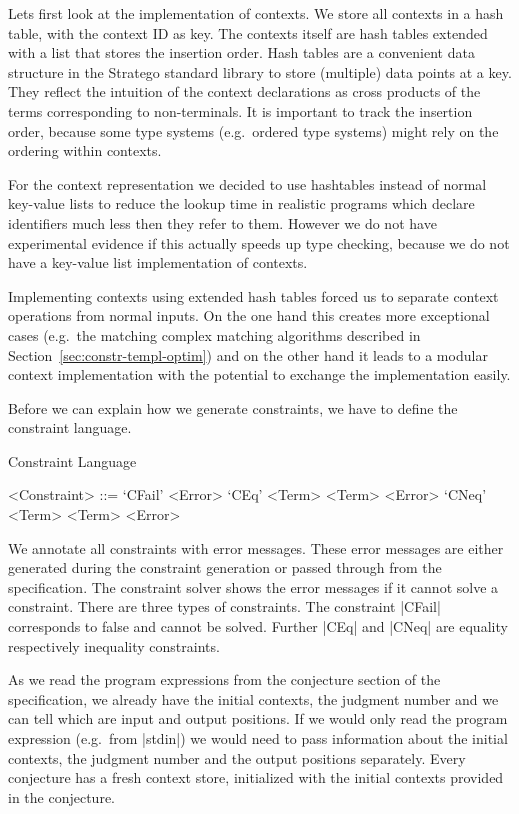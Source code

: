 Lets first look at the implementation of contexts. We store all
contexts in a hash table, with the context ID as key. The contexts
itself are hash tables extended with a list that stores the insertion
order. Hash tables are a convenient data structure in the Stratego
standard library to store (multiple) data points at a key. They
reflect the intuition of the context declarations as cross products of
the terms corresponding to non-terminals. It is important to track the
insertion order, because some type systems (e.g.\ ordered type
systems) might rely on the ordering within contexts.

For the context representation we decided to use hashtables instead of
normal key-value lists to reduce the lookup time in realistic programs
which declare identifiers much less then they refer to them. However
we do not have experimental evidence if this actually speeds up type
checking, because we do not have a key-value list implementation of
contexts.

Implementing contexts using extended hash tables forced us to separate
context operations from normal inputs. On the one hand this creates
more exceptional cases (e.g.\ the matching complex matching algorithms
described in Section~\ref{sec:constr-templ-optim}) and on the other
hand it leads to a modular context implementation with the potential
to exchange the implementation easily.

Before we can explain how we generate constraints, we have to define
the constraint language.

\begin{definition}{Constraint Language}
  \begin{grammar}
    <Constraint> ::= `CFail' <Error>
    \alt `CEq' <Term> <Term> <Error>
    \alt `CNeq' <Term> <Term> <Error>
  \end{grammar}
\end{definition}

We annotate all constraints with error messages. These error messages
are either generated during the constraint generation or passed
through from the specification. The constraint solver shows the error
messages if it cannot solve a constraint. There are three types of
constraints. The constraint \code|CFail| corresponds to false and
cannot be solved. Further \code|CEq| and \code|CNeq| are equality
respectively inequality constraints.

As we read the program expressions from the conjecture section of the
specification, we already have the initial contexts, the judgment
number and we can tell which are input and output positions. If we
would only read the program expression (e.g.\ from \code|stdin|) we
would need to pass information about the initial contexts, the
judgment number and the output positions separately. Every conjecture
has a fresh context store, initialized with the initial contexts
provided in the conjecture.

